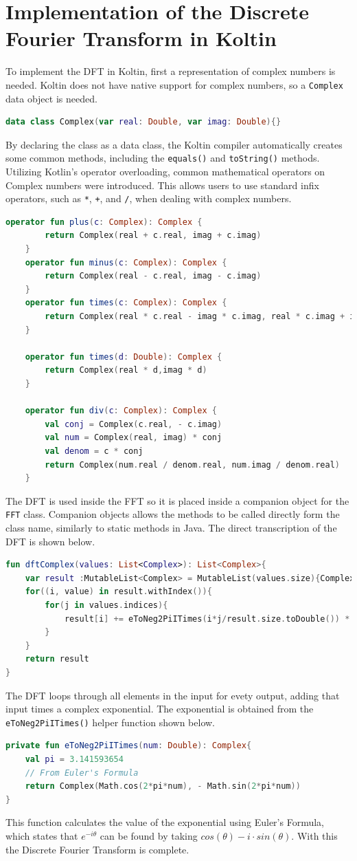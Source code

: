 \documentclass[sigconf]{acmart}
\begin{document}
\section{Implementation of the Discrete Fourier Transform in Koltin}
To implement the DFT in Koltin, first a representation of complex numbers is needed. Koltin does not have native support for complex numbers, so a \texttt{Complex} data object is needed.
\begin{lstlisting}[language=kotlin]
data class Complex(var real: Double, var imag: Double){}
\end{lstlisting}
By declaring the class as a data class, the Koltin compiler automatically creates some common methods, including the \texttt{equals()} and \texttt{toString()} methods. Utilizing Kotlin's operator overloading, common mathematical operators on Complex numbers were introduced. This allows users to use standard infix operators, such as \texttt{*}, \texttt{+}, and \texttt{/}, when dealing with complex numbers.
\begin{lstlisting}[language=kotlin]
operator fun plus(c: Complex): Complex {
        return Complex(real + c.real, imag + c.imag)
    }
    operator fun minus(c: Complex): Complex {
        return Complex(real - c.real, imag - c.imag)
    }
    operator fun times(c: Complex): Complex {
        return Complex(real * c.real - imag * c.imag, real * c.imag + imag * c.real)
    }

    operator fun times(d: Double): Complex {
        return Complex(real * d,imag * d)
    }

    operator fun div(c: Complex): Complex {
        val conj = Complex(c.real, - c.imag)
        val num = Complex(real, imag) * conj
        val denom = c * conj
        return Complex(num.real / denom.real, num.imag / denom.real)
    }
\end{lstlisting}
The DFT is used inside the FFT so it is placed inside a companion object for the \texttt{FFT} class. Companion objects allows the methods to be called directly form the class name, similarly to static methods in Java. The direct transcription of the DFT is shown below.
\begin{lstlisting}[language=kotlin]
fun dftComplex(values: List<Complex>): List<Complex>{
    var result :MutableList<Complex> = MutableList(values.size){Complex(0.0,0.0)}
    for((i, value) in result.withIndex()){
        for(j in values.indices){
            result[i] += eToNeg2PiITimes(i*j/result.size.toDouble()) * values[j]
        }
    }
    return result
}
\end{lstlisting}
The DFT loops through all elements in the input for evety output, adding that input times a complex exponential. The exponential is obtained from the \texttt{eToNeg2PiITimes()} helper function shown below. 
\begin{lstlisting}[language=kotlin]
private fun eToNeg2PiITimes(num: Double): Complex{
    val pi = 3.141593654
    // From Euler's Formula
    return Complex(Math.cos(2*pi*num), - Math.sin(2*pi*num))
}
\end{lstlisting}
This function calculates the value of the exponential using Euler's Formula, which states that $e^{-i\theta}$ can be found by taking $cos(\theta) - i\cdot sin(\theta)$. With this the Discrete Fourier Transform is complete.
\end{document}
